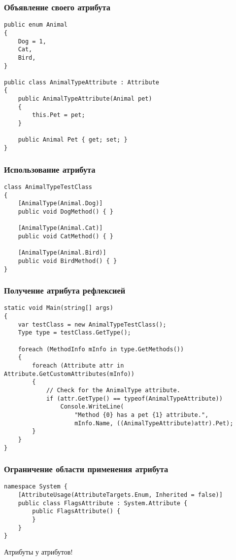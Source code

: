 \documentclass{../../slides-style}
\begin{document}
    \begin{frame}[fragile]
        \frametitle{Объявление своего атрибута}
        \begin{footnotesize}
            \begin{verbatim}
public enum Animal
{
    Dog = 1,
    Cat,
    Bird,
}

public class AnimalTypeAttribute : Attribute
{
    public AnimalTypeAttribute(Animal pet)
    {
        this.Pet = pet;
    }

    public Animal Pet { get; set; }
}
            \end{verbatim}
        \end{footnotesize}
    \end{frame}

    \begin{frame}[fragile]
        \frametitle{Использование атрибута}
        \begin{verbatim}
class AnimalTypeTestClass
{
    [AnimalType(Animal.Dog)]
    public void DogMethod() { }

    [AnimalType(Animal.Cat)]
    public void CatMethod() { }

    [AnimalType(Animal.Bird)]
    public void BirdMethod() { }
}
        \end{verbatim}
    \end{frame}

    \begin{frame}[fragile]
        \frametitle{Получение атрибута рефлексией}
        \begin{footnotesize}
            \begin{verbatim}
static void Main(string[] args)
{
    var testClass = new AnimalTypeTestClass();
    Type type = testClass.GetType();

    foreach (MethodInfo mInfo in type.GetMethods())
    {
        foreach (Attribute attr in Attribute.GetCustomAttributes(mInfo))
        {
            // Check for the AnimalType attribute.
            if (attr.GetType() == typeof(AnimalTypeAttribute))
                Console.WriteLine(
                    "Method {0} has a pet {1} attribute.",
                    mInfo.Name, ((AnimalTypeAttribute)attr).Pet);
        }
    }
}
            \end{verbatim}
        \end{footnotesize}
    \end{frame}

    \begin{frame}[fragile]
        \frametitle{Ограничение области применения атрибута}
        \begin{verbatim}
namespace System {
    [AttributeUsage(AttributeTargets.Enum, Inherited = false)]
    public class FlagsAttribute : System.Attribute {
        public FlagsAttribute() {
        }
    }
}
        \end{verbatim}
        Атрибуты у атрибутов!
    \end{frame}
\end{document}
